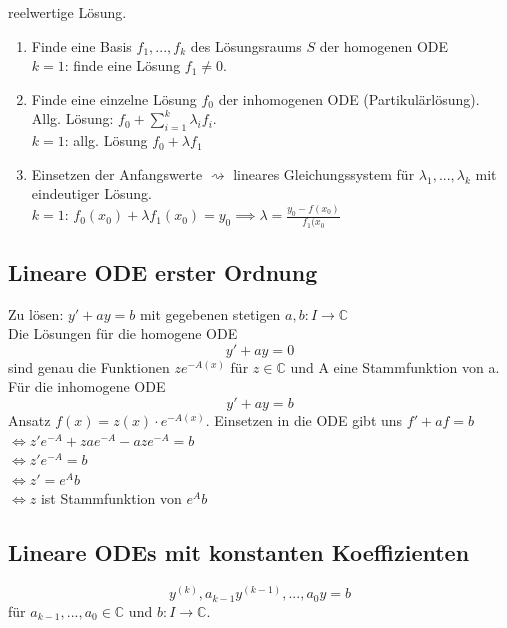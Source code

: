   reelwertige Lösung.\\
  \begin{enumerate}
    \item Finde eine Basis \(f_1,...,f_k\) des Lösungsraums \(S\) der homogenen ODE\\
      \color{Maroon3} \(k=1\): finde eine Lösung \(f_1\neq0\).\color{defaultcolor}
    \item Finde eine einzelne Lösung $f_0$ der inhomogenen ODE (Partikulärlösung).
      Allg. Lösung: \(f_0+\sum\limits_{i=1}^{k}\lambda_i f_i\).\\
      \color{Maroon3} \(k=1\): allg. Lösung \(f_0+\lambda
      f_1\)\color{defaultcolor}
    \item Einsetzen der Anfangswerte \(\rightsquigarrow\) lineares
      Gleichungssystem für \(\lambda_1,...,\lambda_k\) mit eindeutiger Lösung.\\
      \color{Maroon3}\(k=1\): \(f_0(x_0)+\lambda f_1(x_0) = y_0 \implies \lambda
      = \frac{y_0 - f(x_0)}{f_1(x_0}\)
  \end{enumerate}
\subsection{Lineare ODE erster Ordnung}
  Zu lösen: $y'+ay=b$ mit gegebenen stetigen $a,b: I \rightarrow\mathbb C$\\
   Die Lösungen für die homogene ODE $$y'+ay=0$$ sind genau die
  Funktionen $ze^{-A(x)}$ für $z\in\mathbb C$ und A eine Stammfunktion von a.\\
  Für die inhomogene ODE $$y'+ay=b$$ Ansatz $f(x)=z(x)\cdot e^{-A(x)}$.
  Einsetzen in die ODE gibt uns $f'+af=b$\\
  \indent $\iff z'e^{-A}+zae^{-A}-aze^{-A}=b$\\
  \indent $\iff z'e^{-A}=b$\\
  \indent $\iff z'= e^{A}b$\\
  \indent $\iff z$ ist Stammfunktion von $e^{A}b$
\subsection{Lineare ODEs mit konstanten Koeffizienten}
  $$y^{(k)},a_{k-1}y^{(k-1)},...,a_0y=b$$ für $a_{k-1},...,a_0\in\mathbb C$ und
  $b:I\rightarrow\mathbb C$.\\

